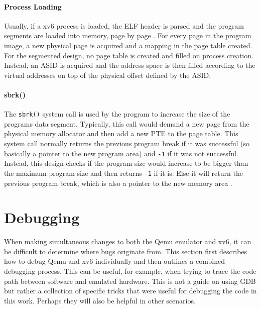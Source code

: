 \paragraph{Process Loading} %
Usually, if a xv6 process is loaded, the ELF header \cite{tisexecutable} is parsed and the program segments are loaded into memory, page by page \cite{cox2011xv6}. For every page in the program image, a new physical page is acquired and a mapping in the page table created. For the segmented design, no page table is created and filled on process creation. Instead, an ASID is acquired and the address space is then filled according to the virtual addresses on top of the physical offset defined by the ASID.

\paragraph{sbrk()}The \texttt{sbrk()} system call is used by the program to increase the size
of the programs data segment. Typically, this call would demand a new page from the physical memory allocator
and then add a new PTE to the page table.
This system call normally returns the previous program break if it was successful (so basically a pointer to
the new program area) and \texttt{-1} if it was not successful.
Instead, this design checks if the program size would increase to be bigger than the maximum program size and
then returns \texttt{-1} if it is. Else it will return the previous program break, which is also a pointer to the new memory area \cite{rochkind2004advanced}.





\section{Debugging}
When making simultaneous changes to both the Qemu emulator and xv6, it can be difficult to determine where bugs originate from. This section first describes how to debug Qemu and xv6 individually and then outlines a combined debugging process. This can be useful, for example, when trying to trace the code path between software and emulated hardware. This is not a guide on using GDB but rather a collection of specific tricks that were useful for debugging the code in this work. Perhaps they will also be helpful in other scenarios.

